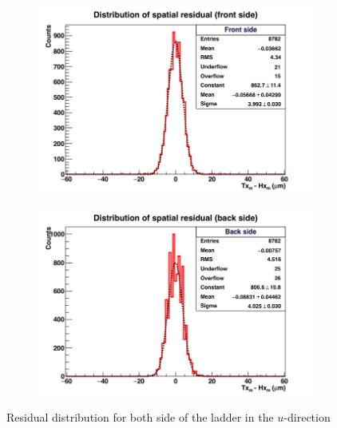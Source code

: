     \begin{figure}[!h]
      \centering
      \begin{subfigure}[t]{0.45\textwidth}
        \centering
        \includegraphics[width = 1.2\textwidth]{Pictures/deformation/hxtxFront_226056.png}
      \end{subfigure}
      \quad
      \begin{subfigure}[t]{0.45\textwidth}
        \centering
        \includegraphics[width = 1.2\textwidth]{Pictures/deformation/hxtxBack_226056.png}
      \end{subfigure}
      \caption{Residual distribution for both side of the ladder in the $u$-direction}
      \label{fig:residualFrontBackLadder}
    \end{figure}

